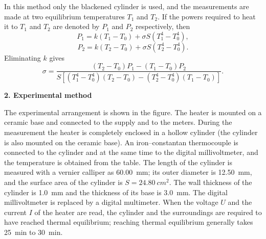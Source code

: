 In this method only the blackened cylinder is used, and the measurements are made at two equilibrium temperatures $T_1$ and $T_2$. If the powers required to heat it to $T_1$ and $T_2$ are denoted by $P_1$ and $P_2$ respectively, then
\begin{equation*}
P_1=k(T_1-T_0)+\sigma S(T_1^{4}-T_0^{4}),
\end{equation*}
\begin{equation*}
P_2=k(T_2-T_0)+\sigma S(T_2^{4}-T_0^{4}).
\end{equation*}
Eliminating $k$ gives
\begin{equation*}
\sigma=\frac{(T_2-T_0)P_1-(T_1-T_0)P_2}
{S\left[(T_1^{4}-T_0^{4})(T_2-T_0)-(T_2^{4}-T_0^{4})(T_1-T_0)\right]}.
\end{equation*}

\textbf{2. Experimental method}

The experimental arrangement is shown in the figure. The heater is mounted on a ceramic base and connected to the supply and to the meters. During the measurement the heater is completely enclosed in a hollow cylinder (the cylinder is also mounted on the ceramic base). An iron--constantan thermocouple is connected to the cylinder and at the same time to the digital millivoltmeter, and the temperature is obtained from the table. The length of the cylinder is measured with a vernier calliper as \SI{60.00}{mm}; its outer diameter is \SI{12.50}{mm}, and the surface area of the cylinder is $S=\SI{24.80}{cm^2}$. The wall thickness of the cylinder is \SI{1.0}{mm} and the thickness of its base is \SI{3.0}{mm}. The digital millivoltmeter is replaced by a digital multimeter. When the voltage $U$ and the current $I$ of the heater are read, the cylinder and the surroundings are required to have reached thermal equilibrium; reaching thermal equilibrium generally takes \SI{25}{min} to \SI{30}{min}.

